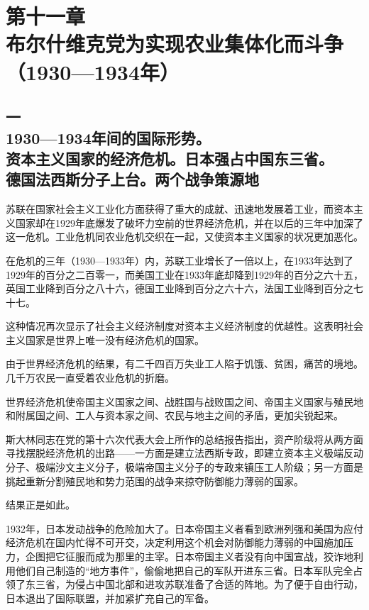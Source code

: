 \section[第十一章\q 布尔什维克党为实现农业集体化而斗争（1930—1934年）]{第十一章\\ 布尔什维克党为实现农业集体化而斗争 \\{（1930—1934年）}}

\subsection[一\q 1930—1934年间的国际形势。资本主义国家的经济危机。日本强占中国东三省。德国法西斯分子上台。两个战争策源地]{一\\ 1930—1934年间的国际形势。\\资本主义国家的经济危机。日本强占中国东三省。\\德国法西斯分子上台。两个战争策源地}

苏联在国家社会主义工业化方面获得了重大的成就、迅速地发展着工业，而资本主义国家却在1929年底爆发了破坏力空前的世界经济危机，并在以后的三年中加深了这一危机。工业危机同农业危机交织在一起，又使资本主义国家的状况更加恶化。

在危机的三年（1930—1933年）内，苏联工业增长了一倍以上，在1933年达到了1929年的百分之二百零一，而美国工业在1933年底却降到1929年的百分之六十五，英国工业降到百分之八十六，德国工业降到百分之六十六，法国工业降到百分之七十七。

这种情况再次显示了社会主义经济制度对资本主义经济制度的优越性。这表明社会主义国家是世界上唯一没有经济危机的国家。

由于世界经济危机的结果，有二千四百万失业工人陷于饥饿、贫困，痛苦的境地。几千万农民一直受着农业危机的折磨。

世界经济危机使帝国主义国家之间、战胜国与战败国之间、帝国主义国家与殖民地和附属国之间、工人与资本家之间、农民与地主之间的矛盾，更加尖锐起来。

斯大林同志在党的第十六次代表大会上所作的总结报告指出，资产阶级将从两方面寻找摆脱经济危机的出路——一方面是建立法西斯专政，即建立资本主义极端反动分子、极端沙文主义分子，极端帝国主义分子的专政来镇压工人阶级；另一方面是挑起重新分割殖民地和势力范围的战争来掠夺防御能力薄弱的国家。

结果正是如此。

1932年，日本发动战争的危险加大了。日本帝国主义者看到欧洲列强和美国为应付经济危机在国内忙得不可开交，决定利用这个机会对防御能力薄弱的中国施加压力，企图把它征服而成为那里的主宰。日本帝国主义者没有向中国宣战，狡诈地利用他们自己制造的“地方事件”，偷偷地把自己的军队开进东三省。日本军队完全占领了东三省，为侵占中国北部和进攻苏联准备了合适的阵地。为了便于自由行动，日本退出了国际联盟，并加紧扩充自己的军备。

